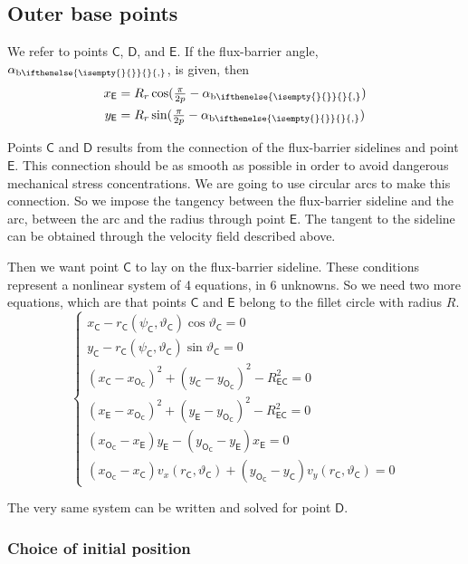\documentclass[b5paper,11pt,oneside,fleqn]{article}
\newcommand{\pt}[1]{\mathsf{#1}}
\newcommand{\te}{\vartheta}
\newcommand{\ab}[1][]{%
\alpha_{\textup{b}
\ifthenelse{\isempty{#1}{}}{}{,#1}%
}}
\newcommand{\pih}[1][]{\tfrac{\pi}{2#1}}
\begin{document}
\subsection{Outer base points}
We refer to points $ \pt{C} $, $ \pt{D} $, and $ \pt{E} $.
If the flux-barrier angle, $ \ab $, is given, then
\begin{equation}
\begin{aligned}
x_\pt{E} &= R_r \cos(\pih[p] - \ab) \\
y_\pt{E} &= R_r \sin(\pih[p] - \ab)
\end{aligned}
\end{equation}

Points $ \pt{C} $ and $ \pt{D} $ results from the connection of the
flux-barrier sidelines and point $ \pt{E} $.
This connection should be as smooth as possible in order to
avoid dangerous mechanical stress concentrations.
We are going to use circular arcs to make this connection.
So we impose the tangency between the flux-barrier sideline and the arc,
between the arc and the radius through point $ \pt{E} $.
The tangent to the sideline can be obtained through the velocity field
described above.

Then we want point $ \pt{C} $ to lay on the flux-barrier sideline. These
conditions represent a nonlinear system of 4 equations, in 6 unknowns.
So we need two more equations, which are that points $ \pt{C} $ and $ \pt{E} $
belong to the fillet circle with radius $ R $.
\begin{equation}
\begin{cases}
x_\pt{C} - r_\pt{C}(\psi_\pt{C}, \te_\pt{C}) \cos\te_\pt{C} = 0 \\
y_\pt{C} - r_\pt{C}(\psi_\pt{C}, \te_\pt{C}) \sin\te_\pt{C} = 0 \\
%
(x_\pt{C} - x_\pt{O_\pt{C}})^2 + (y_\pt{C} - y_\pt{O_\pt{C}})^2
- R_\pt{EC}^2 = 0 \\
(x_\pt{E} - x_\pt{O_\pt{C}})^2 + (y_\pt{E} - y_\pt{O_\pt{C}})^2
- R_\pt{EC}^2 = 0 \\
%
(x_\pt{O_\pt{C}} - x_\pt{E}) y_\pt{E} -
(y_\pt{O_\pt{C}} - y_\pt{E}) x_\pt{E} = 0 \\
%
(x_\pt{O_\pt{C}} - x_\pt{C}) v_x(r_\pt{C},\te_\pt{C}) +
(y_\pt{O_\pt{C}} - y_\pt{C}) v_y(r_\pt{C},\te_\pt{C}) = 0
\end{cases}
\end{equation}

The very same system can be written and solved for point $ \pt{D} $.


\subsubsection{Choice of initial position}
\end{document}
